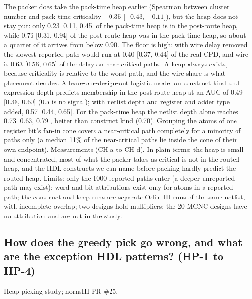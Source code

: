  The packer does take the pack-time heap earlier (Spearman between cluster number and pack-time criticality $-0.35$ [$-0.43$, $-0.11$]), but the heap does not stay put: only 0.23 [0.11, 0.45] of the pack-time heap is in the post-route heap, while 0.76 [0.31, 0.94] of the post-route heap was in the pack-time heap, so about a quarter of it arrives from below 0.90. The floor is high: with wire delay removed the slowest reported path would run at 0.40 [0.37, 0.44] of the real CPD, and wire is 0.63 [0.56, 0.65] of the delay on near-critical paths. A heap always exists, because criticality is relative to the worst path, and the wire share is what placement decides.
 A leave-one-design-out logistic model on construct kind and expression depth predicts membership in the post-route heap at an AUC of 0.49 [0.38, 0.60] (0.5 is no signal); with netlist depth and register and adder type added, 0.57 [0.44, 0.65]. For the pack-time heap the netlist depth alone reaches 0.73 [0.63, 0.79], better than construct kind (0.70). Grouping the atoms of one register bit's fan-in cone covers a near-critical path completely for a minority of paths only (a median 11\% of the near-critical paths lie inside the cone of their own endpoint).
 Measurements (CH-a to CH-d). In plain terms: the heap is small and concentrated, most of what the packer takes as critical is not in the routed heap, and the HDL constructs we can name before packing hardly predict the routed heap. Limits: only the 1000 reported paths enter (a deeper unreported path may exist); word and bit attributions exist only for atoms in a reported path; the construct and keep runs are separate Odin~III runs of the same netlist, with incomplete overlap; two designs hold multipliers; the 20 MCNC designs have no attribution and are not in the study.

\subsection{How does the greedy pick go wrong, and what are the exception HDL patterns? (HP-1 to HP-4)}
\label{sec:e-pick}

 Heap-picking study; nornsIII PR \#25.

